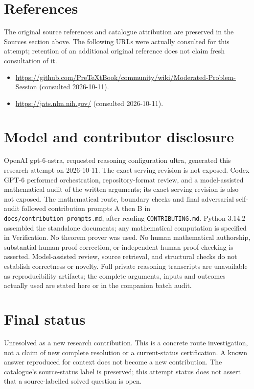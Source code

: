 \documentclass[11pt]{article}
\begin{document}
\section{References}
The original source references and catalogue attribution are preserved in the
Sources section above. The following URLs were actually consulted for this attempt;
retention of an additional original reference does not claim fresh consultation of it.
\begin{itemize}
\item \url{https://github.com/PreTeXtBook/community/wiki/Moderated-Problem-Session} (consulted 2026-10-11). 
\item \url{https://jats.nlm.nih.gov/} (consulted 2026-10-11). 
\end{itemize}
\section{Model and contributor disclosure}
OpenAI gpt-6-astra, requested reasoning configuration ultra, generated this research
attempt on 2026-10-11. The exact serving revision is not exposed. Codex GPT-6
performed orchestration, repository-format review, and a model-assisted mathematical
audit of the written arguments; its exact serving revision
is also not exposed. The mathematical route, boundary checks and final adversarial
self-audit followed contribution prompts A then B in
\texttt{docs/contribution\_prompts.md}, after reading \texttt{CONTRIBUTING.md}.
Python 3.14.2 assembled the standalone documents; any mathematical computation is
specified in Verification. No theorem prover was used. No human mathematical
authorship, substantial human proof correction, or independent human proof checking
is asserted. Model-assisted review, source retrieval, and structural checks do not
establish correctness or novelty. Full private reasoning transcripts are unavailable
as reproducibility artifacts; the complete arguments, inputs and outcomes actually
used are stated here or in the companion batch audit.
\section{Final status}
Unresolved as a new research contribution. This is a concrete route investigation,
not a claim of new complete resolution or a current-status certification. A known
answer reproduced for context does not become a new contribution. The catalogue's
source-status label is preserved; this attempt status does not assert that a
source-labelled solved question is open.
\end{document}
